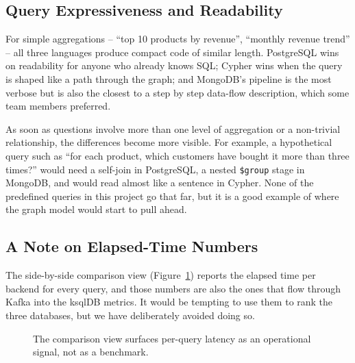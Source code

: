 \documentclass[11pt,a4paper]{article}
\begin{document}
\subsection{Query Expressiveness and Readability}

For simple aggregations -- ``top 10 products by revenue'', ``monthly
revenue trend'' -- all three languages produce compact code of similar
length. PostgreSQL wins on readability for anyone who already knows SQL;
Cypher wins when the query is shaped like a path through the graph; and
MongoDB's pipeline is the most verbose but is also the closest to a step
by step data-flow description, which some team members preferred.

As soon as questions involve more than one level of aggregation or a
non-trivial relationship, the differences become more visible. For
example, a hypothetical query such as ``for each product, which customers
have bought it more than three times?'' would need a self-join in
PostgreSQL, a nested \texttt{\$group} stage in MongoDB, and would read
almost like a sentence in Cypher. None of the predefined queries in this
project go that far, but it is a good example of where the graph model
would start to pull ahead.

\subsection{A Note on Elapsed-Time Numbers}

The side-by-side comparison view (Figure~\ref{fig:compare-screenshot})
reports the elapsed time per backend for every query, and those numbers
are also the ones that flow through Kafka into the ksqlDB metrics. It
would be tempting to use them to rank the three databases, but we have
deliberately avoided doing so.

\begin{figure}[H]
\centering
\caption{The comparison view surfaces per-query latency as an operational signal, not as a benchmark.}
\label{fig:compare-screenshot}
\end{figure}
\end{document}
